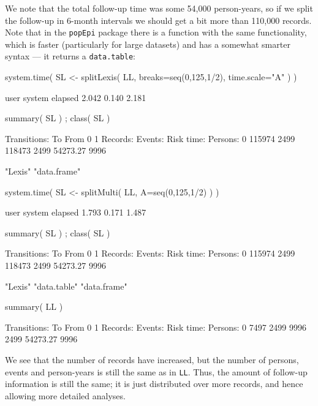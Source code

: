 \begin{enumerate}
  We note that the total follow-up time was some 54,000 person-years,
  so if we split the follow-up in 6-month intervals we should get a
  bit more than 110,000 records. Note that in the \texttt{popEpi}
  package there is a function with the same functionality, which is
  faster (particularly for large datasets) and has a somewhat smarter
  syntax --- it returns a \texttt{data.table}:
\begin{Schunk}
\begin{Sinput}
 system.time( SL <- splitLexis( LL, breaks=seq(0,125,1/2), time.scale="A" ) )
\end{Sinput}
\begin{Soutput}
   user  system elapsed 
  2.042   0.140   2.181 
\end{Soutput}
\begin{Sinput}
 summary( SL ) ; class( SL )
\end{Sinput}
\begin{Soutput}
Transitions:
     To
From      0    1  Records:  Events: Risk time:  Persons:
   0 115974 2499    118473     2499   54273.27      9996
\end{Soutput}
\begin{Soutput}
[1] "Lexis"      "data.frame"
\end{Soutput}
\begin{Sinput}
 system.time( SL <- splitMulti( LL, A=seq(0,125,1/2) ) )
\end{Sinput}
\begin{Soutput}
   user  system elapsed 
  1.793   0.171   1.487 
\end{Soutput}
\begin{Sinput}
 summary( SL ) ; class( SL )
\end{Sinput}
\begin{Soutput}
Transitions:
     To
From      0    1  Records:  Events: Risk time:  Persons:
   0 115974 2499    118473     2499   54273.27      9996
\end{Soutput}
\begin{Soutput}
[1] "Lexis"      "data.table" "data.frame"
\end{Soutput}
\begin{Sinput}
 summary( LL )
\end{Sinput}
\begin{Soutput}
Transitions:
     To
From    0    1  Records:  Events: Risk time:  Persons:
   0 7497 2499      9996     2499   54273.27      9996
\end{Soutput}
\end{Schunk}
  We see that the number of records have increased, but the number of
  persons, events and person-years is still the same as in
  \texttt{LL}. Thus, the amount of follow-up information is still the
  same; it is just distributed over more records, and hence allowing
  more detailed analyses. 

\end{enumerate}

